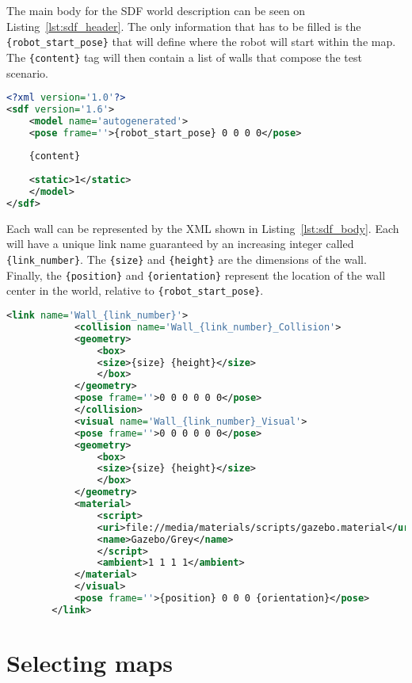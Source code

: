 The main body for the SDF world description can be seen on Listing~\ref{lst:sdf_header}. The only information that has to be filled is the \texttt{\{robot\_start\_pose\}} that will define where the robot will start within the map. The \texttt{\{content\}} tag will then contain a list of walls that compose the test scenario.

\begin{lstlisting}[caption={SDF Header.},label={lst:sdf_header},language=XML]
<?xml version='1.0'?>
<sdf version='1.6'>
    <model name='autogenerated'>
    <pose frame=''>{robot_start_pose} 0 0 0 0</pose>
    
    {content}
    
    <static>1</static>
    </model>
</sdf>
\end{lstlisting} \label{lst:1}

Each wall can be represented by the XML shown in Listing~\ref{lst:sdf_body}. Each will have a unique link name guaranteed by an increasing integer called \texttt{\{link\_number\}}. The \texttt{\{size\}} and \texttt{\{height\}} are the dimensions of the wall. Finally, the \texttt{\{position\}} and \texttt{\{orientation\}} represent the location of the wall center in the world, relative to \texttt{\{robot\_start\_pose\}}.

\begin{lstlisting}[caption={SDF for a single wall.},label={lst:sdf_body},language=XML]
        <link name='Wall_{link_number}'>
            <collision name='Wall_{link_number}_Collision'>
            <geometry>
                <box>
                <size>{size} {height}</size>
                </box>
            </geometry>
            <pose frame=''>0 0 0 0 0 0</pose>
            </collision>
            <visual name='Wall_{link_number}_Visual'>
            <pose frame=''>0 0 0 0 0 0</pose>
            <geometry>
                <box>
                <size>{size} {height}</size>
                </box>
            </geometry>
            <material>
                <script>
                <uri>file://media/materials/scripts/gazebo.material</uri>
                <name>Gazebo/Grey</name>
                </script>
                <ambient>1 1 1 1</ambient>
            </material>
            </visual>
            <pose frame=''>{position} 0 0 0 {orientation}</pose>
        </link>
\end{lstlisting}

\section{Selecting maps}\label{sec:selecting_maps}

